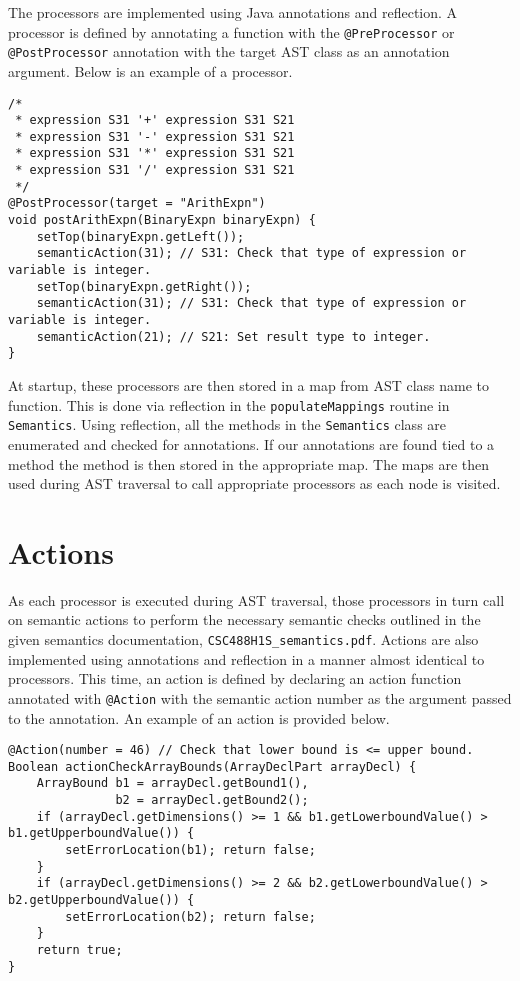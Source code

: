\documentclass[oneside]{amsart}
\theoremstyle{definition}
\theoremstyle{remark}
\numberwithin{equation}{section}
\begin{document}
The processors are implemented using Java annotations and reflection. A
processor is defined by  annotating a function with the \texttt{@PreProcessor}
or \texttt{@PostProcessor} annotation with the target AST class as an annotation
argument. Below is an example of a processor.

\begin{lstlisting}
/*
 * expression S31 '+' expression S31 S21
 * expression S31 '-' expression S31 S21
 * expression S31 '*' expression S31 S21
 * expression S31 '/' expression S31 S21
 */
@PostProcessor(target = "ArithExpn")
void postArithExpn(BinaryExpn binaryExpn) {
    setTop(binaryExpn.getLeft());
    semanticAction(31); // S31: Check that type of expression or variable is integer.
    setTop(binaryExpn.getRight());
    semanticAction(31); // S31: Check that type of expression or variable is integer.
    semanticAction(21); // S21: Set result type to integer.
}
\end{lstlisting}

At startup, these processors are then stored in a map from AST class name to
function. This is done via reflection in the \texttt{populateMappings} routine
in \texttt{Semantics}. Using reflection, all the methods in the
\texttt{Semantics} class are enumerated and checked for annotations. If our
annotations are found tied to a method the method is then stored in the
appropriate map. The maps are then used during AST traversal to call appropriate
processors as each node is visited.

\section{Actions}

As each processor is executed during AST traversal, those processors in turn
call on semantic actions to perform the necessary semantic checks outlined in
the given semantics documentation, \texttt{CSC488H1S\_semantics.pdf}. Actions
are also implemented using annotations and reflection in a manner almost
identical to processors. This time, an action is defined by declaring an action
function annotated with \texttt{@Action} with the semantic action number as the
argument passed to the annotation. An example of an action is provided below.

\begin{lstlisting}
@Action(number = 46) // Check that lower bound is <= upper bound.
Boolean actionCheckArrayBounds(ArrayDeclPart arrayDecl) {
    ArrayBound b1 = arrayDecl.getBound1(),
               b2 = arrayDecl.getBound2();
    if (arrayDecl.getDimensions() >= 1 && b1.getLowerboundValue() > b1.getUpperboundValue()) {
        setErrorLocation(b1); return false;
    }
    if (arrayDecl.getDimensions() >= 2 && b2.getLowerboundValue() > b2.getUpperboundValue()) {
        setErrorLocation(b2); return false;
    }
    return true;
}
\end{lstlisting}
\end{document}
